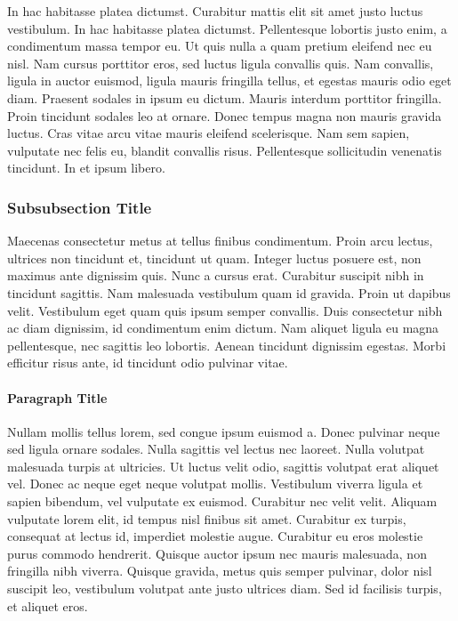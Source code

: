 \documentclass[
	11pt,
	fleqn,
	a4paper,
]{LegrandOrangeBook}
\begin{document}
In hac habitasse platea dictumst. Curabitur mattis elit sit amet justo luctus vestibulum. In hac habitasse platea dictumst. Pellentesque lobortis justo enim, a condimentum massa tempor eu. Ut quis nulla a quam pretium eleifend nec eu nisl. Nam cursus porttitor eros, sed luctus ligula convallis quis. Nam convallis, ligula in auctor euismod, ligula mauris fringilla tellus, et egestas mauris odio eget diam. Praesent sodales in ipsum eu dictum. Mauris interdum porttitor fringilla. Proin tincidunt sodales leo at ornare. Donec tempus magna non mauris gravida luctus. Cras vitae arcu vitae mauris eleifend scelerisque. Nam sem sapien, vulputate nec felis eu, blandit convallis risus. Pellentesque sollicitudin venenatis tincidunt. In et ipsum libero.

\subsubsection{Subsubsection Title} 

Maecenas consectetur metus at tellus finibus condimentum. Proin arcu lectus, ultrices non tincidunt et, tincidunt ut quam. Integer luctus posuere est, non maximus ante dignissim quis. Nunc a cursus erat. Curabitur suscipit nibh in tincidunt sagittis. Nam malesuada vestibulum quam id gravida. Proin ut dapibus velit. Vestibulum eget quam quis ipsum semper convallis. Duis consectetur nibh ac diam dignissim, id condimentum enim dictum. Nam aliquet ligula eu magna pellentesque, nec sagittis leo lobortis. Aenean tincidunt dignissim egestas. Morbi efficitur risus ante, id tincidunt odio pulvinar vitae.

\paragraph{Paragraph Title} Nullam mollis tellus lorem, sed congue ipsum euismod a. Donec pulvinar neque sed ligula ornare sodales. Nulla sagittis vel lectus nec laoreet. Nulla volutpat malesuada turpis at ultricies. Ut luctus velit odio, sagittis volutpat erat aliquet vel. Donec ac neque eget neque volutpat mollis. Vestibulum viverra ligula et sapien bibendum, vel vulputate ex euismod. Curabitur nec velit velit. Aliquam vulputate lorem elit, id tempus nisl finibus sit amet. Curabitur ex turpis, consequat at lectus id, imperdiet molestie augue. Curabitur eu eros molestie purus commodo hendrerit. Quisque auctor ipsum nec mauris malesuada, non fringilla nibh viverra. Quisque gravida, metus quis semper pulvinar, dolor nisl suscipit leo, vestibulum volutpat ante justo ultrices diam. Sed id facilisis turpis, et aliquet eros.
\end{document}
